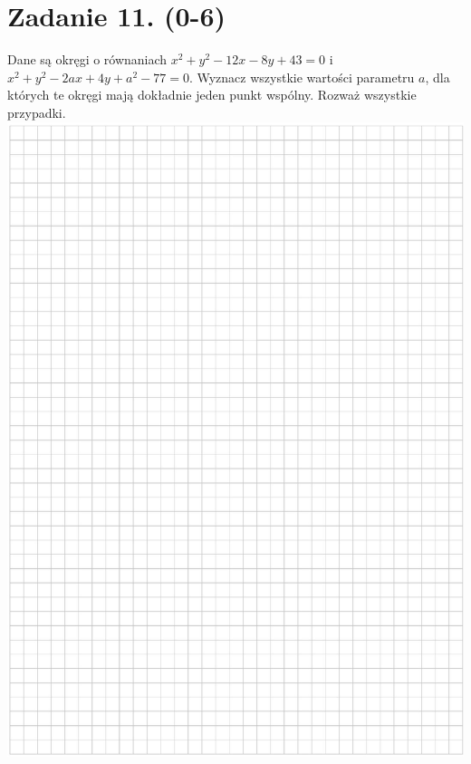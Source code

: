 \documentclass[10pt]{article}
\begin{document}
\section*{Zadanie 11. (0-6)}
Dane są okręgi o równaniach \(x^{2}+y^{2}-12 x-8 y+43=0\) i \(x^{2}+y^{2}-2 a x+4 y+a^{2}-77=0\). Wyznacz wszystkie wartości parametru \(a\), dla których te okręgi mają dokładnie jeden punkt wspólny. Rozważ wszystkie przypadki.\\
\includegraphics[max width=\textwidth, center]{2024_11_21_9df891ea1c7ef9791261g-12}\\
\end{document}
